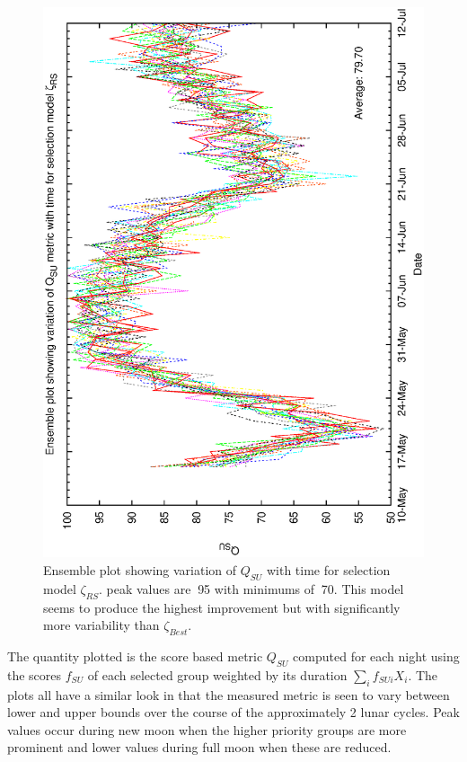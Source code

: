\begin{figure}[h]
\begin{center}   
  \includegraphics[scale=0.5, angle=-90]{figures/biasrs_ensemble.eps}
  \caption[Ensemble plot showing variation of $Q_{SU}$ with time for selection model $\zeta_{RS}$.] 
  {Ensemble plot showing variation of $Q_{SU}$ with time for selection model $\zeta_{RS}$. peak values are $~$95 with minimums of $~$70. This model seems to produce the highest improvement but with significantly more variability than $\zeta_{Best}$.}
  \label{fig:ensemble_relscorebias}   
\end{center}
\end{figure}


The quantity plotted is the score based metric $Q_{SU}$ computed for each night using the scores $f_{SU}$ of each selected group weighted by its duration $\sum_i{f_{SUi}X_i}$. The plots all have a similar look in that the measured metric is seen to vary between lower and upper bounds over the course of the approximately 2 lunar cycles. Peak values occur during new moon when the higher priority groups are more prominent and lower values during full moon when these are reduced. 

